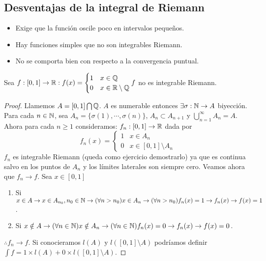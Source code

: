\subsection{Desventajas de la integral de Riemann}
\begin{itemize}
    \item Exige que la función oscile poco en intervalos pequeños.
    \item Hay funciones simples que no son integrables Riemann.
    \item No se comporta bien con respecto a la convergencia puntual.
\end{itemize}

\begin{eg}
    Sea $f: [0, 1] \to \mathbb{R} : f(x) = \begin{cases}
            1 & x \in \mathbb{Q}              \\
            0 & x \in \mathbb{R} \setminus \mathbb{Q}
        \end{cases} f$ no es integrable Riemann.
    \begin{proof}
        Llamemos $A = [0, 1] \bigcap \mathbb{Q}$. $A$ es numerable entonces $\exists \sigma: \mathbb{N} \to A$ biyección. Para cada $n \in \mathbb{N}$, sea
        $A_n = \{ \sigma(1), \cdots, \sigma(n) \}$, $A_n \subset A_{n+1}$ y $\bigcup_{n=1}^{\infty} A_n = A$.
        Ahora para cada $n \geq 1$ consideramos:
        $f_n: [0, 1] \to \mathbb{R}$ dada por
        \begin{equation}
            f_n(x) = \begin{cases}
                1 & x \in A_n                  \\
                0 & x \in [0, 1] \setminus A_n
            \end{cases}
        \end{equation}
        $f_n$ es integrable Riemann (queda como ejercicio demostrarlo) ya que es continua salvo en los puntos de $A_n$ y
        los límites laterales son siempre cero.
        Veamos ahora que $f_n \to f$. Sea $x \in [0, 1]$ \begin{enumerate}
            \item Si $x \in A \to x \in A_{n_0}, n_0 \in \mathbb{N} \to (\forall n > n_0) x \in A_n \to (\forall n > n_0) f_n(x) = 1 \to f_n(x) \to f(x) = 1$.
            \item Si $x \notin A \to (\forall n \in \mathbb{N}) x \notin A_n \to (\forall n \in \mathbb{N}) f_n(x) = 0 \to f_n(x) \to f(x) = 0$.
        \end{enumerate} $\therefore f_n \to f$.
        Si conocieramos $l(A)$ y $l([0, 1] \setminus A)$ podríamos definir $\int f = 1 \times l(A) + 0 \times l([0, 1] \setminus A)$.
    \end{proof}
\end{eg}

